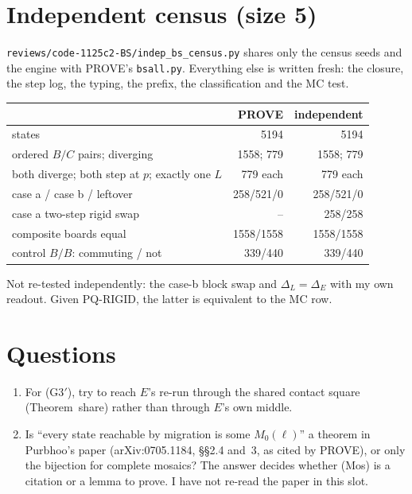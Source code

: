 \documentclass[11pt]{article}
\begin{document}
\section*{Independent census (size 5)}
\texttt{reviews/code-1125c2-BS/indep\_bs\_census.py} shares only the census seeds and the engine with PROVE's \texttt{bsall.py}. Everything else is written fresh: the closure, the step log, the typing, the prefix, the classification and the MC test.
\begin{center}\small\begin{tabular}{lrr}\toprule
& PROVE & independent\\\midrule
states & 5194 & 5194\\
ordered $B/C$ pairs; diverging & 1558; 779 & 1558; 779\\
both diverge; both step at $p$; exactly one $L$ & 779 each & 779 each\\
case a / case b / leftover & 258/521/0 & 258/521/0\\
case a two-step rigid swap & -- & 258/258\\
composite boards equal & 1558/1558 & 1558/1558\\
control $B/B$: commuting / not & 339/440 & 339/440\\\bottomrule
\end{tabular}\end{center}
Not re-tested independently: the case-b block swap and $\Delta_L=\Delta_E$ with my own readout. Given PQ-RIGID, the latter is equivalent to the MC row.

\section*{Questions}
\begin{enumerate}
\item For (G3$'$), try to reach $E$'s re-run through the shared contact square (Theorem~share) rather than through $E$'s own middle.
\item Is ``every state reachable by migration is some $M_0(\ell)$'' a theorem in Purbhoo's paper (arXiv:0705.1184, \S\S2.4 and~3, as cited by PROVE), or only the bijection for complete mosaics? The answer decides whether (Mos) is a citation or a lemma to prove. I have not re-read the paper in this slot.
\end{enumerate}
\end{document}
